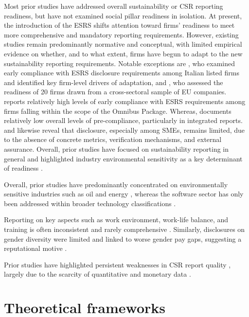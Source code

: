 Most prior studies have addressed overall sustainability or CSR reporting readiness,
but have not examined social pillar readiness in isolation. 
At present, the introduction of the ESRS shifts attention toward firms' readiness to 
meet more comprehensive and mandatory reporting requirements. However, existing studies 
remain predominantly normative and conceptual, with limited empirical evidence 
on whether, and to what extent, firms have begun to adapt to the new sustainability 
reporting requirements. Notable exceptions are \textcite{Nicolo2025}, who examined early compliance with 
ESRS disclosure requirements among Italian listed firms and identified key firm-level drivers of 
adaptation, and \textcite{Filho2025}, who assessed the readiness of 20 firms drawn from a cross-sectoral 
sample of EU companies. \textcite{Nicolo2025} reports relatively high levels of early compliance 
with ESRS requirements among firms falling within the scope of the Omnibus Package. Whereas, 
\textcite{Raimo2025} documents relatively low overall levels of pre-compliance, 
particularly in integrated reports. \textcite{Filho2025} and \textcite{Montero2025} likewise reveal 
that disclosure, especially among SMEs, remains limited, due to the absence of concrete metrics, 
verification mechanisms, and external assurance. Overall, prior studies have focused on 
sustainability reporting in general and highlighted industry environmental sensitivity 
as a key determinant of readiness \parencite{Filho2025, Raimo2025, Nicolo2025, Montero2025}.



Overall, prior studies have predominantly 
concentrated on environmentally sensitive industries such as oil and energy \parencite{Filho2025, Raimo2025, Nicolo2025}, 
whereas the software sector has only been addressed within broader technology classifications \parencite{Montero2025}.


Reporting on key aspects such as work environment, work-life balance, 
and training is often inconsistent and rarely comprehensive \parencite{Greig2021}. Similarly,
disclosures on gender diversity were limited and linked to worse gender pay gaps,
suggesting a reputational motive \parencite{Huang2022}.


Prior studies have highlighted 
persistent weaknesses in CSR report quality \parencite{DiChiacchio2024}, largely due to the scarcity of 
quantitative and monetary data \parencite{Michelon2015}.


\section{Theoretical frameworks}

